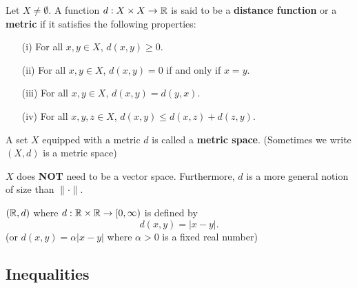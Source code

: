 \documentclass[a4paper]{report}
\begin{document}
\begin{definition}
Let \(  X \neq \emptyset  \). A function \( d: X \times X \to \mathbb{R}  \) is said to be a \textbf{distance function} or a \textbf{metric} if it satisfies the following properties:
\begin{enumerate}
    \item[(i)] For all \( x,y \in X  \), \( d(x,y) \geq 0  \).
    \item[(ii)] For all \( x,y \in X  \), \( d(x,y) = 0  \) if and only if \( x = y  \).
    \item[(iii)] For all \( x,y \in X  \), \( d(x,y) = d(y,x) \).
    \item[(iv)] For all \( x,y,z \in X  \), \( d(x,y) \leq d(x,z) + d(z,y) \).
\end{enumerate}
A set \( X  \) equipped with a metric \( d  \) is called a \textbf{metric space}. (Sometimes we write \( (X,d)  \) is a metric space)
\end{definition}
\begin{remark}
    \( X  \) does \textbf{NOT} need to be a vector space. Furthermore, \( d  \) is a more general notion of size than \( \| \cdot \| \).
\end{remark}


\begin{eg}
    \( (\mathbb{R} , d)  \) where \( d: \mathbb{R} \times \mathbb{R} \to [0,\infty)   \) is defined by 
    \[  d(x,y) = |  x - y  |. \]
    (or \( d(x,y) = \alpha |  x - y  |  \) where \( \alpha > 0  \) is a fixed real number)


\end{eg}

\subsection{Inequalities}
\end{document}
